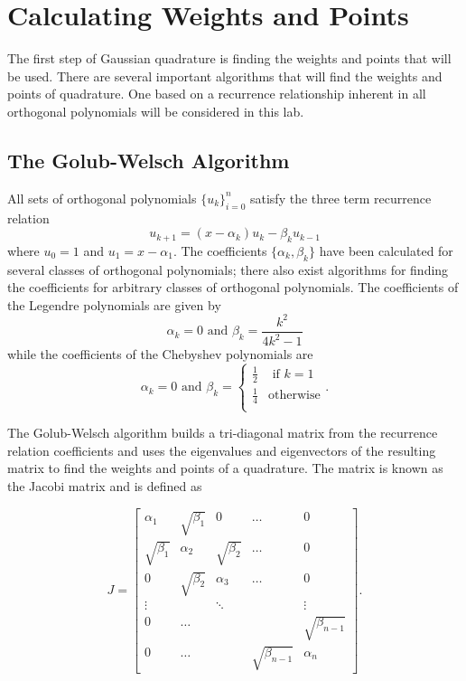 \section*{Calculating Weights and Points} %

The first step of Gaussian quadrature is finding the weights and points that will be used.
There are several important algorithms that will find the weights and points of quadrature.
One based on a recurrence relationship inherent in all orthogonal polynomials will be considered in this lab.

\subsection*{The Golub-Welsch Algorithm} %

All sets of orthogonal polynomials $\{u_k\}_{i=0}^{n}$ satisfy the three term recurrence relation
\[
u_{k+1} = (x-\alpha_k)u_k - \beta_ku_{k-1}
\]
where $u_{0} = 1$ and $u_1 = x-\alpha_1$.
The coefficients $\{\alpha_k, \beta_k\}$ have been calculated for several classes of orthogonal polynomials; there also exist algorithms for finding the coefficients for arbitrary classes of orthogonal polynomials.
The coefficients of the Legendre polynomials are given by
\[
\alpha_k=0 \text{ and } \beta_k=\frac{k^2}{4k^2-1}
\]
while the coefficients of the Chebyshev polynomials are
\[
\alpha_k=0 \text{ and } \beta_k=\begin{cases} \frac{1}{2} &\mbox{ if } k = 1\\ \frac{1}{4} &\text{otherwise} \\ \end{cases}.
\]

The Golub-Welsch algorithm builds a tri-diagonal matrix from the recurrence relation coefficients and uses the eigenvalues and eigenvectors of the resulting matrix to find the weights and points of a quadrature.
The matrix is known as the Jacobi matrix and is defined as

\[
J = \begin{bmatrix}
\alpha_1 & \sqrt{\beta_1} & 0 & \dots & 0 \\
\sqrt{\beta_1} & \alpha_2 & \sqrt{\beta_2} & \dots & 0 \\
0 & \sqrt{\beta_2} & \alpha_3 &  \dots & 0 \\
\vdots & & \ddots & & \vdots \\
0 & \dots & & & \sqrt{\beta_{n-1}} \\
0 & \dots & & \sqrt{\beta_{n-1}} & \alpha_n
\end{bmatrix}.
\]

